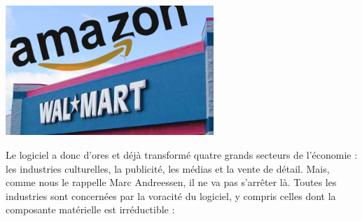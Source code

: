 \documentclass[11pt,twoside,a4paper]{article}
\begin{document}
\begin{minipage}[h]{8.00cm}
	\includegraphics[width=7.85cm]{img/amazon-walmart.jpg}
\end{minipage} \hfill \begin{minipage}[h]{10cm}
	Le logiciel a donc d'ores et d{\'e}j{\`a} transform{\'e} quatre grands secteurs de l'{\'e}conomie : les industries culturelles, la publicit{\'e}, les m{\'e}dias et la vente de d{\'e}tail. Mais, comme nous le rappelle Marc Andreessen, il ne va pas s'arr{\^e}ter l{\`a}. Toutes les industries sont concern{\'e}es par la voracit{\'e} du logiciel, y compris celles dont la composante mat{\'e}rielle est irr{\'e}ductible :
\end{minipage} ~\\~\\

\end{document}
